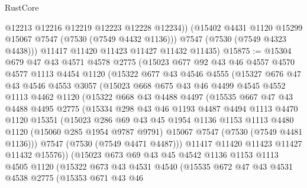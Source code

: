 \begin{lexlean}{RustCore}
\begin{coremodule}
            @12213
            @12216
            @12219
            @12223
            @12228
            @12234))
        (@15402 @4431 @1120 @15299 @15067 @7547 (@7530 (@7549 @4432 @1136)))
        @7547
        (@7530 (@7549 @4323 @4438)))
      @11417
      @11420
      @11423
      @11427
      @11432
      @11435)
@15875 := @15304
    @679
    @47
    @43
    @4571
    @4578
    @2775
    (@15023
      @677
      @92
      @43
      @46
      @4557
      @4570
      @4577
      @1113
      @4454
      @1120
      (@15322
        @677
        @43
        @4546
        @4555
        (@15327
          @676
          @47
          @43
          @4546
          @4553
          @3057
          (@15023
            @668
            @675
            @43
            @46
            @4499
            @4545
            @4552
            @1113
            @4462
            @1120
            (@15322
              @668
              @43
              @4488
              @4497
              (@15535
                @667
                @47
                @43
                @4488
                @4495
                @2775
                (@15334
                  @298
                  @43
                  @46
                  @1193
                  @4487
                  @4494
                  @1113
                  @4470
                  @1120
                  @15351
                  (@15023
                    @286
                    @69
                    @43
                    @45
                    @1954
                    @1136
                    @1153
                    @1113
                    @4480
                    @1120
                    (@15060 @285 @1954 @9787 @9791)
                    @15067
                    @7547
                    (@7530 (@7549 @4481 @1136)))
                  @7547
                  (@7530 (@7549 @4471 @4487)))
                @11417
                @11420
                @11423
                @11427
                @11432
                @15576))
            (@15023
              @673
              @69
              @43
              @45
              @4542
              @1136
              @1153
              @1113
              @4505
              @1120
              (@15322
                @673
                @43
                @4531
                @4540
                (@15535
                  @672
                  @47
                  @43
                  @4531
                  @4538
                  @2775
                  (@15353
                    @671
                    @43
                    @46

\end{coremodule}
\end{lexlean}
